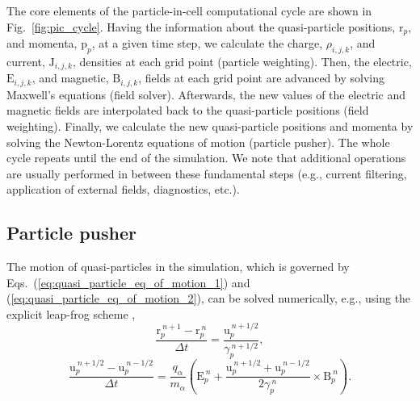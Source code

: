\documentclass[10pt, a4paper, twoside, openright]{report}
\renewcommand{\vec}[1]{\boldsymbol{\mathrm{#1}}}
\begin{document}

The core elements of the particle-in-cell computational cycle are shown in Fig.~\ref{fig:pic_cycle}. Having the information about the quasi-particle positions, $ \vec{r}_p $, and momenta, $ \vec{p}_p $, at a given time step, we calculate the charge, $ \rho_{i, j, k} $, and current, $ \vec{J}_{i, j, k} $, densities at each grid point (particle weighting). Then, the electric, $ \vec{E}_{i,j,k} $, and magnetic, $ \vec{B}_{i, j, k} $, fields at each grid point are advanced by solving Maxwell's equations (field solver). Afterwards, the new values of the electric and magnetic fields are interpolated back to the quasi-particle positions (field weighting). Finally, we calculate the new quasi-particle positions and momenta by solving the Newton-Lorentz equations of motion (particle pusher). The whole cycle repeats until the end of the simulation. We note that additional operations are usually performed in between these fundamental steps (e.g., current filtering, application of external fields, diagnostics, etc.).


\subsection{Particle pusher}

The motion of quasi-particles in the simulation, which is governed by Eqs.~(\ref{eq:quasi_particle_eq_of_motion_1}) and (\ref{eq:quasi_particle_eq_of_motion_2}), can be solved numerically, e.g., using the explicit leap-frog scheme \cite{Press2007},
\begin{equation}\label{eq:particle_pusher_eq_1}
	\frac{\vec{r}_{p}^{\:n+1} - \vec{r}_{p}^{\:n}}{\Delta t} = \frac{\vec{u}_{p}^{\:n + 1/2}}{\gamma_p^{\:n+1/2}},
\end{equation}
\begin{equation}\label{eq:particle_pusher_eq_2}
	\frac{\vec{u}_{p}^{\:n+1/2} - \vec{u}_{p}^{\:n-1/2}}{\Delta t} = \frac{q_{\alpha}}{m_{\alpha}} \left( \vec{E}_{p}^{\:n} + \frac{\vec{u}_{p}^{\:n+1/2} + \vec{u}_{p}^{\:n-1/2}}{2 \gamma_p^{\:n}} \times \vec{B}_{p}^{\:n} \right).
\end{equation}
\end{document}
